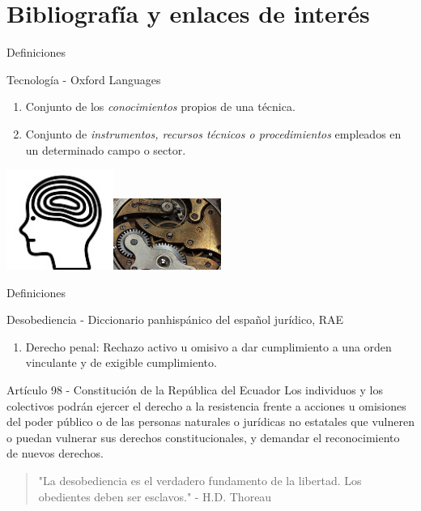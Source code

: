 \documentclass[spanish]{beamer}
\begin{document}
\section{Bibliografía y enlaces de interés}

\begin{frame}{Definiciones}
    \begin{block}{Tecnología - Oxford Languages}
        \begin{enumerate}
            \item Conjunto de los \emph{conocimientos} propios de una técnica.
            \item Conjunto de \emph{instrumentos, recursos técnicos o procedimientos} empleados en un determinado campo o sector.
        \end{enumerate}                             
    \end{block}
    \centering
    \includegraphics[width=3.5cm]{img/mind.jpg}\includegraphics[width=3.5cm]{img/clockwork.jpg}
\end{frame}
\begin{frame}{Definiciones}
    \begin{block}{Desobediencia - Diccionario panhispánico del español jurídico, RAE}
        \begin{enumerate}
            \item Derecho penal: Rechazo activo u omisivo a dar cumplimiento a una orden vinculante y de exigible cumplimiento.
        \end{enumerate}
    \end{block}
    \begin{block}{Artículo 98 - Constitución de la República del Ecuador}
        Los individuos y los colectivos podrán ejercer el derecho a la resistencia frente a acciones u omisiones del poder público o de las personas naturales o jurídicas no estatales que vulneren o puedan vulnerar sus derechos constitucionales, y demandar el reconocimiento de nuevos derechos.
    \end{block}
\end{frame}
\begin{frame}{}
    \begin{quote}
        "La desobediencia es el verdadero fundamento de la libertad. Los obedientes deben ser esclavos." - H.D. Thoreau
    \end{quote}
\end{frame}
\end{document}
